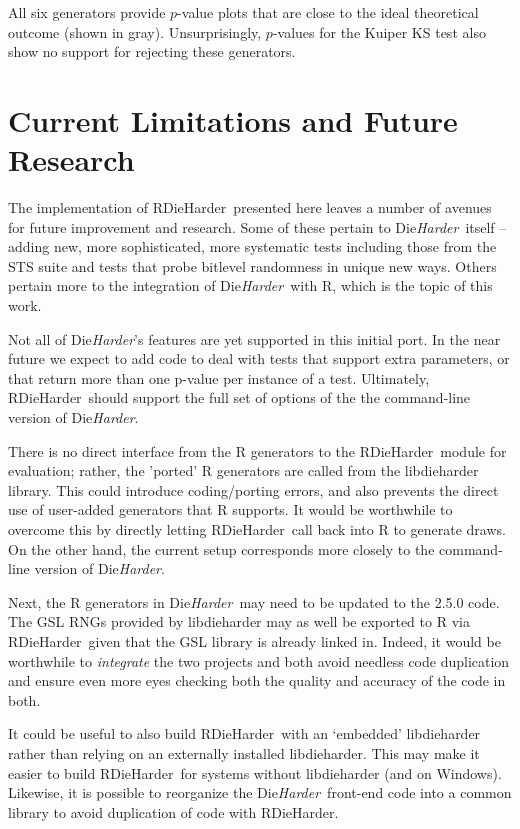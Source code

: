 \documentclass[12pt]{article}
\newcommand{\pkg}[1]{{\normalfont\fontseries{b}\selectfont #1}}
\newcommand{\dieharder}{\textrm{Die}\textsl{Harder}}
\newcommand{\rdieharder}{\pkg{RDieHarder}}
\begin{document}
All six generators provide $p$-value plots that are close to the ideal
theoretical outcome (shown in gray). Unsurprisingly, $p$-values for the
Kuiper KS test also show no support for rejecting these generators.


\section{Current Limitations and Future Research}

The implementation of \rdieharder\ presented here leaves a number of avenues
for future improvement and research.  Some of these pertain to \dieharder\
itself -- adding new, more sophisticated, more systematic tests
including those from the STS suite and tests that probe bitlevel
randomness in unique new ways.  Others pertain more to the integration
of \dieharder\ with R, which is the topic of this work.

Not all of \dieharder's features are yet supported in this initial port.
In the near future we expect to add code to deal with tests that support
extra parameters, or that return more than one p-value per instance of a
test.  Ultimately, \rdieharder\ should support the full set of options of
the the command-line version of \dieharder.

There is no direct interface from the R generators to the \rdieharder\
module for evaluation; rather, the 'ported' R generators are called from the
libdieharder library. This could introduce coding/porting errors, and also
prevents the direct use of user-added generators that R supports. It would be
worthwhile to overcome this by directly letting \rdieharder\ call back
into R to generate draws. On the other hand, the current setup corresponds
more closely to the command-line version of \dieharder.

Next, the R generators in \dieharder\ may need to be updated to the 2.5.0
code. The GSL RNGs provided by libdieharder may as well be exported to R via
\rdieharder\ given that the GSL library is already linked in.
Indeed, it would be worthwhile to {\em integrate} the two projects and
both avoid needless code duplication and ensure even more eyes checking
both the quality and accuracy of the code in both.

It could be useful to also build \rdieharder\ with an `embedded' libdieharder
rather than relying on an externally installed libdieharder. This may make
it easier to build \rdieharder\ for systems without libdieharder (and on
Windows).  Likewise, it is possible to reorganize the \dieharder\ front-end
code into a common library to avoid duplication of code with \rdieharder.
\end{document}
